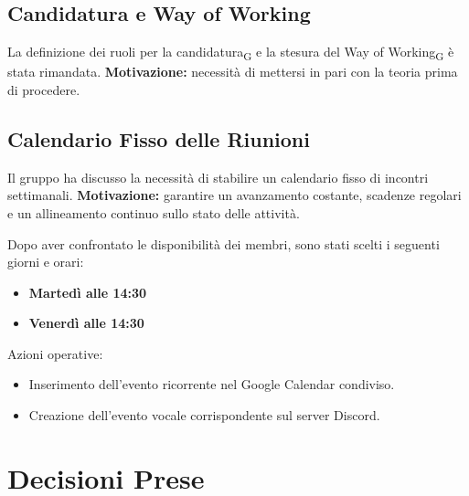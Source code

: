 \subsection{Candidatura e Way of Working}
La definizione dei ruoli per la candidatura\textsubscript{G} e la stesura del Way of Working\textsubscript{G} è stata rimandata.  
\textbf{Motivazione:} necessità di mettersi in pari con la teoria prima di procedere.

\subsection{Calendario Fisso delle Riunioni}
Il gruppo ha discusso la necessità di stabilire un calendario fisso di incontri settimanali.  
\textbf{Motivazione:} garantire un avanzamento costante, scadenze regolari e un allineamento continuo sullo stato delle attività.

Dopo aver confrontato le disponibilità dei membri, sono stati scelti i seguenti giorni e orari:
\begin{itemize}
    \item \textbf{Martedì alle 14:30}
    \item \textbf{Venerdì alle 14:30}
\end{itemize}

Azioni operative:
\begin{itemize}
    \item Inserimento dell’evento ricorrente nel Google Calendar condiviso.
    \item Creazione dell’evento vocale corrispondente sul server Discord.
\end{itemize}

\section{Decisioni Prese}

\renewcommand{\arraystretch}{1.3}

